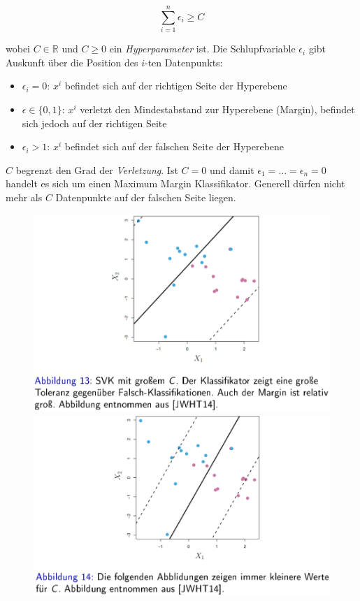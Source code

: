 \documentclass{report}
\begin{document}
$$\sum_{i=1}^n\epsilon_i\geq C$$

wobei $C\in \mathbb{R}$ und $C \geq 0$ ein \textit{Hyperparameter} ist. Die Schlupfvariable $\epsilon_i$ gibt Auskunft über
die Position des $i$-ten Datenpunkts:\\
\vspace*{-1.5em}
\begin{itemize}
  \item $\epsilon_i = 0$: $x^i$ befindet sich auf der richtigen Seite der Hyperebene
  \item $\epsilon\in\{0,1\}$: $x^i$ verletzt den Mindestabstand zur Hyperebene (Margin), befindet sich jedoch auf der richtigen Seite
  \item $\epsilon_i > 1$: $x^i$ befindet sich auf der falschen Seite der Hyperebene
\end{itemize}

$C$ begrenzt den Grad der \textit{Verletzung}. Ist $C=0$ und damit $\epsilon_1 = ... = \epsilon_n = 0$ handelt es sich um einen
Maximum Margin Klassifikator. Generell dürfen nicht mehr als $C$ Datenpunkte auf der falschen Seite liegen.

\begin{figure}[H]
  \centering
  \begin{minipage}[b]{0.4\textwidth}
    \includegraphics[scale=.265]{ml06_13}
  \end{minipage}
  \hfill
  \begin{minipage}[b]{0.4\textwidth}
    \includegraphics[scale=.275]{ml06_14}
  \end{minipage}
\end{figure}
\end{document}
